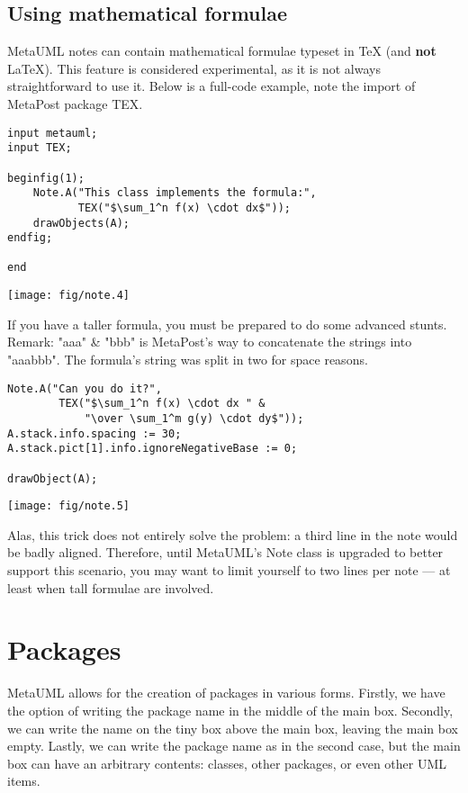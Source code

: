 \documentclass{article}
\newcommand{\code}{\ttfamily}
\begin{document}
\subsection{Using mathematical formulae}

MetaUML notes can contain mathematical formulae typeset in TeX (and {\bf not} LaTeX). This feature is considered experimental, as it is not always straightforward to use it. Below is a full-code example, note the import of MetaPost package {\code TEX}.

\begin{multicols}{2}
\begin{verbatim}
input metauml;
input TEX;

beginfig(1);
    Note.A("This class implements the formula:", 
           TEX("$\sum_1^n f(x) \cdot dx$"));
    drawObjects(A);
endfig;

end
\end{verbatim}
\columnbreak
\hspace{0.5cm}\texttt{[image: fig/note.4]}
\end{multicols}

If you have a taller formula, you must be prepared to do some advanced stunts. Remark: {\code "aaa" \& "bbb"} is MetaPost's way to concatenate the strings into {\code "aaabbb"}. The formula's string was split in two for space reasons.

\begin{multicols}{2}
\begin{verbatim}
Note.A("Can you do it?", 
        TEX("$\sum_1^n f(x) \cdot dx " &
            "\over \sum_1^m g(y) \cdot dy$"));
A.stack.info.spacing := 30;
A.stack.pict[1].info.ignoreNegativeBase := 0;

drawObject(A);
\end{verbatim}
\columnbreak
\hspace{3cm}\texttt{[image: fig/note.5]}
\end{multicols}

Alas, this trick does not entirely solve the problem: a third line in the note would be badly aligned. Therefore, until MetaUML's {\code Note} class is upgraded to better support this scenario, you may want to limit yourself to two lines per note --- at least when tall formulae are involved.

\section{Packages}

MetaUML allows for the creation of packages in various forms. Firstly, we have the option of writing the package name in the middle of the main box. Secondly, we can write the name on the tiny box above the main box, leaving the main box empty. Lastly, we can write the package name as in the second case, but the main box can have an arbitrary contents: classes, other packages, or even other UML items. 
\end{document}
